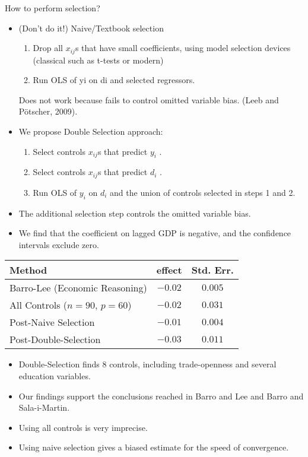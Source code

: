 \documentclass{beamer}
\begin{document}
\begin{frame}{How to perform selection?}
	\begin{itemize}
		\item  (Don't do it!) Naive/Textbook selection
		\begin{enumerate}
\item Drop all $x_{ij}$s that have small coefficients, using model selection
devices (classical such as t-tests or modern)
\item Run OLS of yi on di and selected regressors.
\end{enumerate}

Does not work because fails to control omitted variable bias.
(Leeb and P\"otscher, 2009).
\item We propose Double Selection approach:
\begin{enumerate}
\item Select controls $x_{ij}$s that predict $y_i$ .
\item Select controls $x_{ij}$s that predict $d_i$ .
\item Run OLS of $y_i$ on $d_i$ and the union of controls selected in steps 1
and 2.
\end{enumerate}
\item The additional selection step controls the omitted variable bias.
\item We find that the coefficient on lagged GDP is negative, and the
confidence intervals exclude zero.
	\end{itemize}
\end{frame}

\begin{frame}
\begin{tabular}{lcc}
\hline \hline
Method &effect &Std. Err.\\ \hline
Barro-Lee (Economic Reasoning) &$-0.02$& $0.005$\\ \hline
All Controls ($n = 90$, $p = 60$)& $-0.02$& $0.031$\\ \hline
Post-Naive Selection &$-0.01$ &$0.004$\\ \hline
Post-Double-Selection &$-0.03$ &$0.011$\\ \hline \hline
\end{tabular}

\begin{itemize}
	\item Double-Selection finds 8 controls, including trade-openness and
several education variables.
\item Our findings support the conclusions reached in Barro and Lee
and Barro and Sala-i-Martin.
\item Using all controls is very imprecise.
\item Using naive selection gives a biased estimate for the speed of
convergence.
\end{itemize}
\end{frame}
\end{document}
